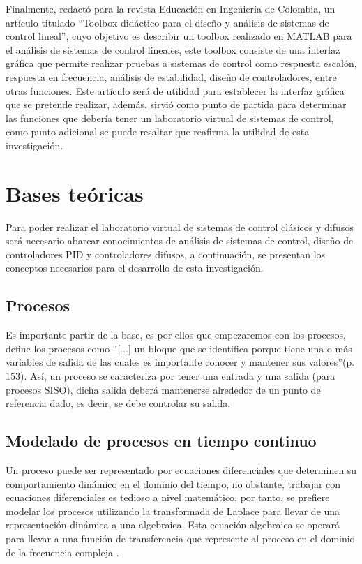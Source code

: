 	Finalmente, \textcite{cadavid2009toolbox} redactó para la revista Educación en Ingeniería de Colombia, un artículo titulado \enquote{Toolbox didáctico para el diseño y análisis de sistemas de control lineal}, cuyo objetivo es describir un toolbox realizado en MATLAB para el análisis de sistemas de control lineales, este toolbox consiste de una interfaz gráfica que permite realizar pruebas a sistemas de control como respuesta escalón, respuesta en frecuencia, análisis de estabilidad, diseño de controladores, entre otras funciones. Este artículo será de utilidad para establecer la interfaz gráfica que se pretende realizar, además, sirvió como punto de partida para determinar las funciones que debería tener un laboratorio virtual de sistemas de control, como punto adicional se puede resaltar que reafirma la utilidad de esta investigación. 
	
\section{Bases teóricas}
	
    Para poder realizar el laboratorio virtual de sistemas de control clásicos y difusos será necesario abarcar conocimientos de análisis de sistemas de control, diseño de controladores PID y controladores difusos, a continuación, se presentan los conceptos necesarios para el desarrollo de esta investigación.
    
    \subsection{Procesos}
		
		Es importante partir de la base, es por ellos que empezaremos con los procesos, \textcite{sanchez2003control} define los procesos como \enquote{[...] un bloque que se identifica porque tiene una o más variables de salida de las cuales es importante conocer y mantener sus valores}(p.$\,$153). Así, un proceso se caracteriza por tener una entrada y una salida (para procesos SISO), dicha salida deberá mantenerse alrededor de un punto de referencia dado, es decir, se debe controlar su salida.
	
	\subsection{Modelado de procesos en tiempo continuo}
	
		Un proceso puede ser representado por ecuaciones diferenciales que determinen su comportamiento dinámico en el dominio del tiempo, no obstante, trabajar con ecuaciones diferenciales es tedioso a nivel matemático, por tanto, se prefiere modelar los procesos utilizando la transformada de Laplace para llevar de una representación dinámica a una algebraica. Esta ecuación algebraica se operará para llevar a una función de transferencia que represente al proceso en el dominio de la frecuencia compleja \Parencite{smith1985principles}.
	
